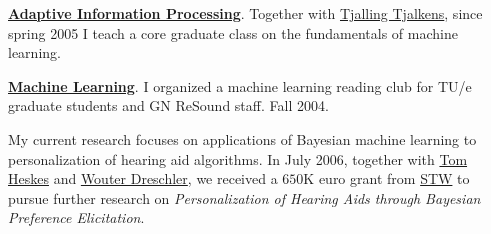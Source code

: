 \begin{items}
\item \href{http://www.sps.ele.tue.nl/members/b.vries/teaching/5mb20/home.html}{\textbf{Adaptive Information Processing}}. Together with \href{http://www.sps.ele.tue.nl/members/T.J.Tjalkens}{Tjalling Tjalkens}, since spring 2005 I teach a core graduate class on the fundamentals of machine learning.
\item \href{http://www.sps.ele.tue.nl/members/b.vries/teaching/mlrc04/home.html}{\textbf{Machine Learning}}. I organized a machine learning reading club for TU/e graduate students and GN ReSound staff. Fall 2004.
\end{items}


My current research focuses on applications of Bayesian machine learning to personalization of hearing aid algorithms. In July 2006, together with  \href{http://www.cs.ru.nl/staff/Tom.Heskes}{Tom Heskes} and \href{http://www.ac-amc.nl/medewerkers/dreschler.html}{Wouter Dreschler}, we received a $650$K euro grant from \href{http://www.stw.nl}{STW} to pursue further research on \emph{Personalization of Hearing Aids through Bayesian Preference Elicitation}.

